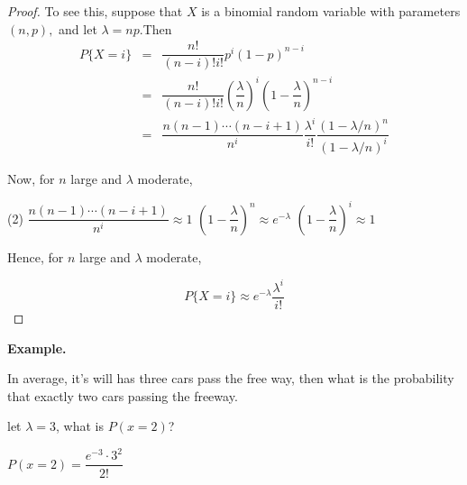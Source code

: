 \begin{proof}

To see this, suppose that $X$ is a binomial random variable with parameters $(n,p),$ and let $\lambda = np$.Then
	\begin{eqnarray*}
		P\{X = i\} &=& \dfrac{n!}{(n-i)!i!}p^i(1 - p)^{n - i}\\
		&=& \dfrac{n!}{(n-i)!i!}\left(\dfrac{\lambda}{n}\right)^i\left(1 - \dfrac{\lambda}{n}\right)^{n - i}\\
		&=& \dfrac{n(n-1)\cdots(n-i+1)}{n^i}\dfrac{\lambda^i}{i!}\dfrac{(1 - \lambda /n)^n}{(1 - \lambda /n)^i}
	\end{eqnarray*}
	
	Now, for $n$ large and $\lambda$ moderate,
	
	\begin{tasks}(2)
		\task[$\bullet$] $\dfrac{n(n-1)\cdots(n-i+1)}{n^i} \approx 1$
		\task[$\bullet$] $\left( 1 -\dfrac{\lambda}{n}\right)^n\approx e^{-\lambda}$
		\task[$\bullet$] $\left( 1 -\dfrac{\lambda}{n}\right)^i \approx 1$
	\end{tasks}
	
	Hence, for $n$ large and $\lambda$ moderate,
	
	$$P\{X = i\} \approx e^{-\lambda}\dfrac{\lambda^i}{i!}$$
\end{proof}

\textbf{Example.}

In average, it's will has three cars pass the free way, then what is the probability that exactly two cars passing the freeway.

\begin{solution}
	let $\lambda = 3$, what is $P(x=2)$?
	
	$P(x = 2) = \dfrac{e^{-3}\cdot 3^2}{2!}$
\end{solution}























